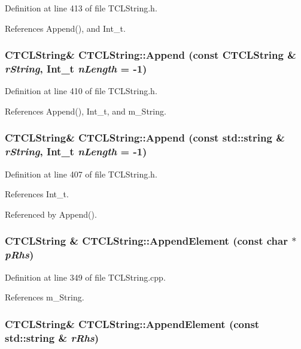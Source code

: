 Definition at line 413 of file TCLString.h.

References Append(), and Int\_\-t.
\subsubsection{\setlength{\rightskip}{0pt plus 5cm}CTCLString\& CTCLString::Append (const CTCLString \& {\em r\-String}, {\bf Int\_\-t} {\em n\-Length} = -1)\hspace{0.3cm}{\tt  [inline]}}\label{classCTCLString_a16}




Definition at line 410 of file TCLString.h.

References Append(), Int\_\-t, and m\_\-String.
\subsubsection{\setlength{\rightskip}{0pt plus 5cm}CTCLString\& CTCLString::Append (const std::string \& {\em r\-String}, {\bf Int\_\-t} {\em n\-Length} = -1)\hspace{0.3cm}{\tt  [inline]}}\label{classCTCLString_a15}




Definition at line 407 of file TCLString.h.

References Int\_\-t.

Referenced by Append().
\subsubsection{\setlength{\rightskip}{0pt plus 5cm}CTCLString \& CTCLString::Append\-Element (const char $\ast$ {\em p\-Rhs})}\label{classCTCLString_a22}




Definition at line 349 of file TCLString.cpp.

References m\_\-String.
\subsubsection{\setlength{\rightskip}{0pt plus 5cm}CTCLString\& CTCLString::Append\-Element (const std::string \& {\em r\-Rhs})\hspace{0.3cm}{\tt  [inline]}}\label{classCTCLString_a21}




